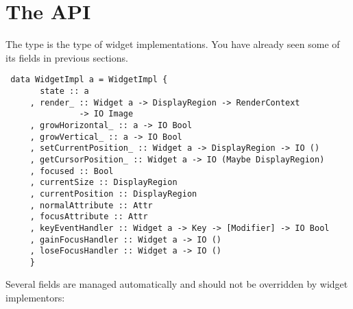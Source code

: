 \section{The  API}

The  type is the type of widget implementations.  You
have already seen some of its fields in previous sections.

\begin{verbatim}
 data WidgetImpl a = WidgetImpl {
       state :: a
     , render_ :: Widget a -> DisplayRegion -> RenderContext
               -> IO Image
     , growHorizontal_ :: a -> IO Bool
     , growVertical_ :: a -> IO Bool
     , setCurrentPosition_ :: Widget a -> DisplayRegion -> IO ()
     , getCursorPosition_ :: Widget a -> IO (Maybe DisplayRegion)
     , focused :: Bool
     , currentSize :: DisplayRegion
     , currentPosition :: DisplayRegion
     , normalAttribute :: Attr
     , focusAttribute :: Attr
     , keyEventHandler :: Widget a -> Key -> [Modifier] -> IO Bool
     , gainFocusHandler :: Widget a -> IO ()
     , loseFocusHandler :: Widget a -> IO ()
     }
\end{verbatim}

Several fields are managed automatically and should not be overridden
by widget implementors:

